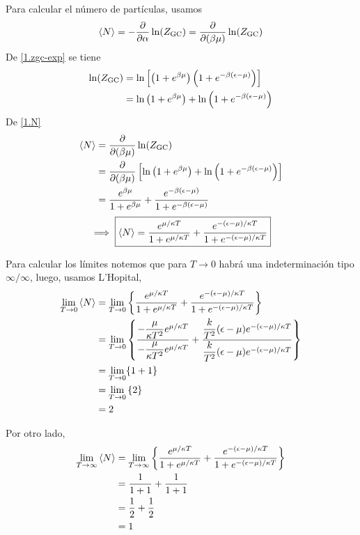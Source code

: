 \begin{sol}
\begin{enumerate}
Para calcular el número de partículas, usamos
\begin{equation}\label{1.N}
  \ev{N}=-\pdv{\a}\ln(\zgc)=\pdv{(\b\m )}\ln(\zgc)
\end{equation}
De \eqref{1.zgc-exp} se tiene
\begin{align}
  \ln(Z_{\rm GC})&=\ln \left[\left(1+e^{\beta \mu }\right)\left(1+e^{-\beta(\epsilon-\mu )}\right)\right]\\
  &=\ln\left(1+e^{\beta \mu }\right)+ \ln \left(1+e^{-\beta(\epsilon-\mu )}\right)
\end{align}
De \eqref{1.N}
\begin{align}
  \ev{N}&=\pdv{(\b\m )}\ln(\zgc)\\
  &=\pdv{(\b \m)  }\left[\ln\left(1+e^{\b \m }\right)+ \ln \left(1+e^{-\b(\epsilon-\m )}\right)\right]\\
  &=\frac{e^{\b\m }}{1+e^{\b \m }}+\frac{e^{-\b (\epsilon-\m )}}{1+e^{-\b(\epsilon-\m )}}
\end{align}
\begin{equation}
	\implies 	\boxed{\ev{N}=\frac{e^{\m/\k T }}{1+e^{ \m/\k T }}+\frac{e^{-(\epsilon-\m )/\k T}}{1+e^{-(\epsilon-\m )/\k T}}}
\end{equation}

Para calcular los límites notemos que para $T\to 0$ habrá una indeterminación tipo $\infty	/\infty$, luego, usamos L'Hopital,
\begin{align}
  \lim_{T\to 0 }\ev{N}&=\lim_{T\to 0}\left\{\frac{e^{\m/\k T }}{1+e^{ \m/\k T }}+\frac{e^{-(\epsilon-\m )/\k T}}{1+e^{-(\epsilon-\m )/\k T}}\right\}\\
  &=\lim_{T\to 0}\left\{\frac{-\dfrac{\m }{\k T^2}e^{\m/\k T}}{-\dfrac{\m }{\k T^2}e^{\m/\k T}}+\frac{\dfrac{k}{T^2}(\epsilon-\m )e^{-(\epsilon-\m )/\k T}}{\dfrac{k}{T^2}(\epsilon-\m )e^{-(\epsilon-\m )/\k T}}\right\}\\
  &=\lim_{T\to 0}\{1+1\}\\
  &=\lim_{T\to 0}\left\{2\right\}\\
  &=2
\end{align}

Por otro lado,
\begin{align}
  \lim_{T\to \infty }\ev{N}&=\lim_{T\to\infty }\left\{\frac{e^{\m/\k T }}{1+e^{ \m/\k T }}+\frac{e^{-(\epsilon-\m )/\k T}}{1+e^{-(\epsilon-\m )/\k T}}\right\}\\
  &=\frac{1}{1+1}+\frac{1}{1+1}\\
  &=\frac{1}{2}+\frac{1}{2}\\
  &=1
\end{align}
\end{enumerate}

















\end{sol}
